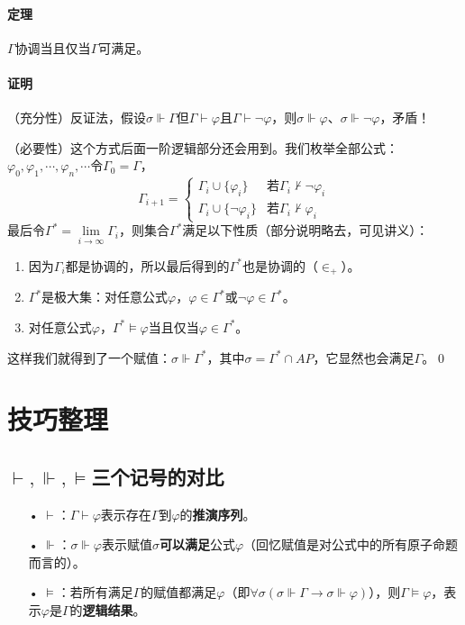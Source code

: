 \documentclass[b5paper,oneside]{ctexbook}
\begin{document}
\paragraph{定理}$\Gamma$协调当且仅当$\Gamma$可满足。
\paragraph{证明}（充分性）反证法，假设$\sigma\Vdash\Gamma$但$\Gamma\vdash\varphi$且$\Gamma\vdash\neg\varphi$，则$\sigma\Vdash\varphi$、$\sigma\Vdash\neg\varphi$，矛盾！

（必要性）这个方式后面一阶逻辑部分还会用到。我们枚举全部公式：$\varphi_0,\varphi_1,\cdots ,\varphi_n,\cdots$令$\Gamma_0=\Gamma$，
\[\Gamma_{i+1}=\begin{cases}
\Gamma_i\cup\{\varphi_i\}&\text{若}\Gamma_i\not\vdash\neg\varphi_i
\\\Gamma_i\cup\{\neg\varphi_i\}&\text{若}\Gamma_i\not\vdash\varphi_i
\end{cases}\]
最后令$\Gamma^*=\lim\limits_{i\to\infty}\Gamma_i$，则集合$\Gamma^*$满足以下性质（部分说明略去，可见讲义）：
\begin{enumerate}
\item 因为$\Gamma_i$都是协调的，所以最后得到的$\Gamma^*$也是协调的（$\in_+$）。
\item $\Gamma^*$是极大集：对任意公式$\varphi$，$\varphi\in\Gamma^*$或$\neg\varphi\in\Gamma^*$。
\item 对任意公式$\varphi$，$\Gamma^*\models\varphi$当且仅当$\varphi\in\Gamma^*$。
\end{enumerate}
这样我们就得到了一个赋值：$\sigma\Vdash\Gamma^*$，其中$\sigma=\Gamma^*\cap AP$，它显然也会满足$\Gamma$。\hfill\qed
\section{技巧整理}
\subsection{$\vdash,\Vdash,\models$三个记号的对比}
\begin{enumerate}
\item[•]$\vdash$：$\Gamma\vdash\varphi$表示存在$\Gamma$到$\varphi$的\textbf{推演序列}。
\item[•]$\Vdash$：$\sigma\Vdash\varphi$表示赋值$\sigma$\textbf{可以满足}公式$\varphi$（回忆赋值是对公式中的所有原子命题而言的）。
\item[•]$\models$：若所有满足$\Gamma$的赋值都满足$\varphi$（即$\forall\sigma (\sigma\Vdash\Gamma\rightarrow\sigma\Vdash\varphi)$），则$\Gamma\models\varphi$，表示$\varphi$是$\Gamma$的\textbf{逻辑结果}。
\end{enumerate}
\end{document}
